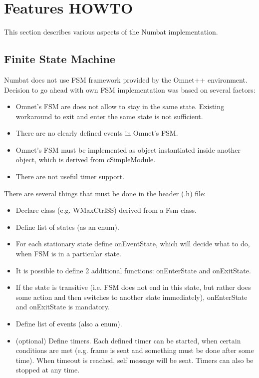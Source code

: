 \section{Features HOWTO}
This section describes various aspects of the Numbat implementation.

\subsection{Finite State Machine}
Numbat does not use FSM framework provided by the Omnet++
environment. Decision to go ahead with own FSM implementation was
based on several factors: 

\begin{itemize}
\item Omnet's FSM are does not allow to stay in the same
  state. Existing workaround to exit and enter the same state is not
  sufficient.
\item There are no clearly defined events in Omnet's FSM.
\item Omnet's FSM must be implemented as object instantiated inside
  another object, which is derived from cSimpleModule.
\item There are not useful timer support.
\end{itemize}

There are several things that must be done in the header (.h) file:
\begin{itemize}
\item Declare class (e.g. WMaxCtrlSS) derived from a Fsm class.
\item Define list of states (as an enum).
\item For each stationary state define onEventState, which will decide
  what to do, when FSM is in a particular state.
\item It is possible to define 2 additional functions: onEnterState
  and onExitState.
\item If the state is transitive (i.e. FSM does not end in this state,
  but rather does some action and then switches to another state
  immediately), onEnterState and onExitState is mandatory.
\item Define list of events (also a enum).
\item (optional) Define timers. Each defined timer can be started,
  when certain conditions are met (e.g. frame is sent and something
  must be done after some time). When timeout is reached, self message
  will be sent. Timers can also be stopped at any time.
\end{itemize}

